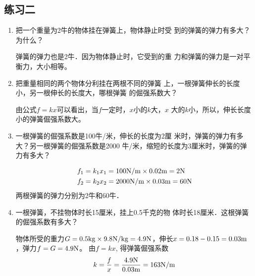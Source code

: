 \subsection{练习二}
\begin{enumerate}
\item 把一个重量为2牛的物体挂在弹簧上，物体静止时受
到的弹簧的弹力有多大？为什么？

\begin{solution}
    弹簧的弹力也是2牛．因为物体静止时，它受到的重
力和弹簧的弹力是一对平衡力，大小相等。
\end{solution}
\item 把重量相同的两个物体分利挂在两根不同的弹簧
上，一根弹簧伸长的长度小，另一根伸长的长度大，哪根弹簧
的倔强系数大？

\begin{solution}
    由公式$f=kx$可以看出，当$f$一定时，$x$小的$k$大，$x$
大的$k$小，所以，伸长长度小的弹簧倔强系数大。
\end{solution}
\item 一根弹簧的倔强系数是100牛/米，伸长的长度为2厘
米时，弹簧的弹力有多大？另一根弹簧的倔强系数是2000
牛/米，缩短的长度为3厘米时，弹簧的弹力有多大？

\begin{solution}
   \[\begin{split}
       f_1&=k_1x_1=100{\rm N/m}\times0.02{\rm m}=2{\rm N}\\
f_2&=k_2x_2=2000{\rm N/m}\times0.03{\rm m}=60{\rm N}
   \end{split} \]
两根弹簧的弹力分别为2牛和60牛．
\end{solution}
\item 一根弹簧，不挂物体时长15厘米，挂上0.5千克的物
体时长18厘米．这根弹簧的倔强系数有多大？

\begin{solution}
    物体所受的重力$G=0.5{\rm kg}\times9.8{\rm N/kg}=4.9
{\rm N}$，伸长$x=0.18-0.15=0.03{\rm m}$，弹力$f=G=4.9{\rm N}$。
由$f=kx$, 得弹簧倔强系数
\[k=\frac{f}{x}=\frac{4.9{\rm N}}{0.03{\rm m}}=163{\rm N/m}\]
\end{solution}
\end{enumerate}

